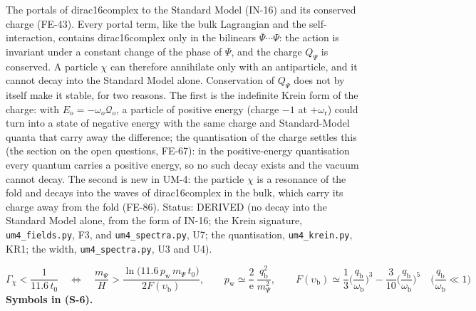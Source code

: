 \documentclass[
  10pt,
]{article}
\begin{document}
The portals of dirac16complex to the Standard Model (IN-16) and its
conserved charge (FE-43). Every portal term, like the bulk Lagrangian
and the self-interaction, contains dirac16complex only in the bilinears
\(\bar\Psi\cdots\Psi\): the action is invariant under a constant change
of the phase of \(\Psi\), and the charge \(Q_\Psi\) is conserved. A
particle \(\chi\) can therefore annihilate only with an antiparticle,
and it cannot decay into the Standard Model alone. Conservation of
\(Q_\Psi\) does not by itself make it stable, for two reasons. The first
is the indefinite Krein form of the charge: with
\(E_o = -\omega_o\mathcal{Q}_o\), a particle of positive energy (charge
\(-1\) at \(+\omega_{\mathrm{r}}\)) could turn into a state of negative
energy with the same charge and Standard-Model quanta that carry away
the difference; the quantisation of the charge settles this (the section
on the open questions, FE-67): in the positive-energy quantisation every
quantum carries a positive energy, so no such decay exists and the
vacuum cannot decay. The second is new in UM-4: the particle \(\chi\) is
a resonance of the fold and decays into the waves of dirac16complex in
the bulk, which carry its charge away from the fold (FE-86). Status:
DERIVED (no decay into the Standard Model alone, from the form of IN-16;
the Krein signature, \texttt{um4\_fields.py}, F3, and
\texttt{um4\_spectra.py}, U7; the quantisation, \texttt{um4\_krein.py},
KR1; the width, \texttt{um4\_spectra.py}, U3 and U4).

\[
\Gamma_\chi < \frac{1}{11.6\,t_0}\quad\Leftrightarrow\quad
\frac{m_\Psi}{H} > \frac{\ln\big(11.6\,p_{\mathrm{w}}\,m_\Psi\,t_0\big)}{2F(\upsilon_{\mathrm{b}})},\qquad
p_{\mathrm{w}} \simeq \frac{2}{\mathrm{e}}\,\frac{q_{\mathrm{b}}^2}{m_\Psi^2},\qquad
F(\upsilon_{\mathrm{b}}) \simeq \frac13\Big(\frac{q_{\mathrm{b}}}{\omega_{\mathrm{b}}}\Big)^3 - \frac{3}{10}\Big(\frac{q_{\mathrm{b}}}{\omega_{\mathrm{b}}}\Big)^5\quad
\Big(\frac{q_{\mathrm{b}}}{\omega_{\mathrm{b}}} \ll 1\Big) \tag{S-6}
\] \textbf{Symbols in (S-6).}
\end{document}
